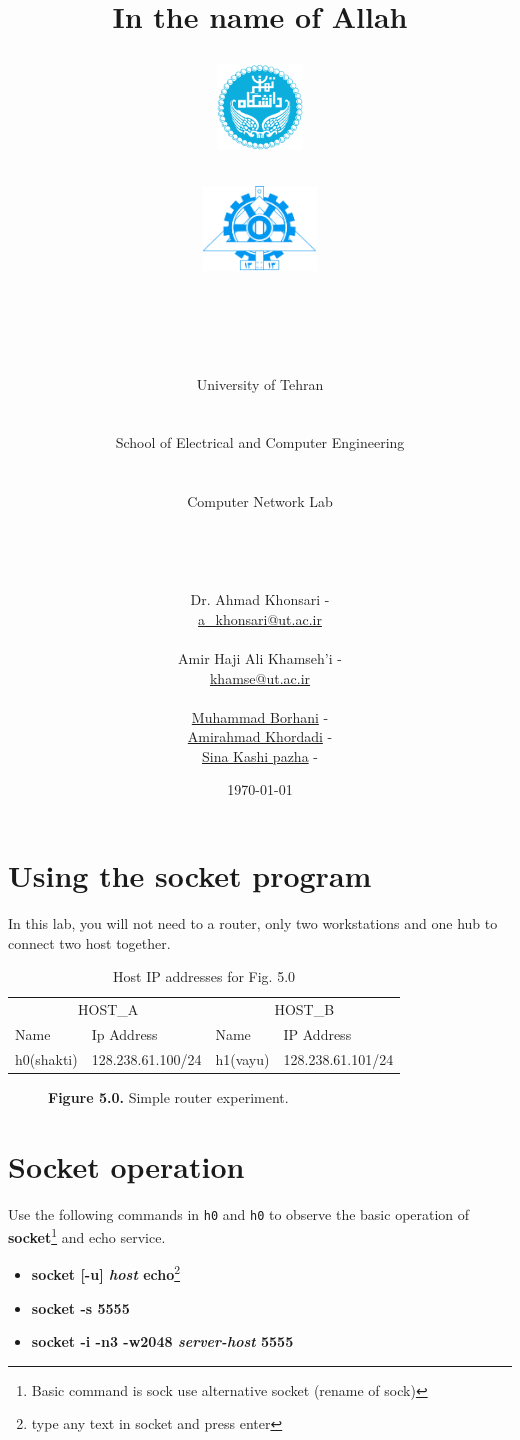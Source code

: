 \documentclass[10pt,a4paper]{article}
\title{
\normalsize In the name of Allah\\
\vspace{10pt}
\LARGE\FR{بسم \allah\  الرحمن الرحیم}
\vspace{10pt}
\begin{center}
	\begin{minipage}{0.48\textwidth} \begin{flushleft}
			\includegraphics[height=64pt,width=64pt]{../img/logo.png}
	\end{flushleft}\end{minipage}
	\begin{minipage}{0.48\textwidth} \begin{flushright}
			\includegraphics[height=64pt]{../img/eng-logo.png}
	\end{flushright}\end{minipage}
\end{center}
\vspace*{-64pt}
	\huge \titleText\\
\vspace{40pt}
}
\author{
	\huge University of Tehran\\
    \LARGE \FR{دانشگاه تهران}\\\\
    \LARGE School of Electrical and Computer Engineering\\
    \FR{دانشکده مهندسی برق و کامپیوتر}\\\\
    \Large Computer Network Lab\\
    \FR{آزمایشگاه شبکه‌های کامپیوتری}\\\\\\\\
    \normalfont
    Dr. Ahmad Khonsari - \FR{احمد خونساری}\\
    \href{mailto:a_khonsari@ut.ac.ir}{a\_khonsari@ut.ac.ir}\\\\
    \normalsize
    Amir Haji Ali Khamseh'i - \FR{امیر حاجی علی خمسه‌ء}\\
    \href{mailto:khamse@ut.ac.ir}{khamse@ut.ac.ir}\\\\
    \normalsize \href{mailto:m.borhani@ut.ac.ir}{Muhammad Borhani} - \FR{محمد برهانی}\\
	\normalsize \href{mailto:a.a.khordadi@ut.ac.ir}{Amirahmad Khordadi} - \FR{امیر احمد خردادی}\\
	\normalsize \href{mailto:sina\_kashipazha@ut.ac.ir}{Sina Kashi pazha} - \FR{سینا کاشی پزها}\\
}
\date{\vspace{30pt}\today\\\vspace{10pt}{\selectlanguage{farsi}\today}}
\numberwithin{equation}{section}
\numberwithin{figure}{section}
\numberwithin{table}{section}
\begin{document}

\maketitle


\pagebreak
\section*{Using the socket program}
	In this lab, you will not need to a router, only two workstations and one hub to connect two host together.
	\begin{table}[H]
        \caption{Host IP addresses for Fig. 5.0}
        \vspace{5pt}
        \centering
        \large
        \begin{tabular}{ *4l }
            \hline \hline
            \multicolumn{2}{c}{HOST\_A} & \multicolumn{2}{c}{HOST\_B} \\
            Name & Ip Address & Name & IP Address \\
            \hline 
            h0(shakti) & 128.238.61.100/24 & h1(vayu) & 128.238.61.101/24\\
            \hline \hline
            \end{tabular}
    \end{table}

    \begin{figure}[H]
        \centering
        \caption{\textbf{Figure 5.0.} Simple router experiment.}        
    \end{figure}

\section{Socket operation}
	Use the following commands in \texttt{h0} and \texttt{h0} to observe the basic operation of \textbf{socket}\footnote{Basic command is sock use alternative socket (rename of sock)} and echo service.
	\begin{itemize}
		\item \textbf{socket [-u] \textit{host} echo}\footnote{type any text in socket and press enter}
		\item \textbf{socket -s 5555}
		\item \textbf{socket -i -n3 -w2048 \textit{server-host} 5555}
	\end{itemize}
\end{document}

